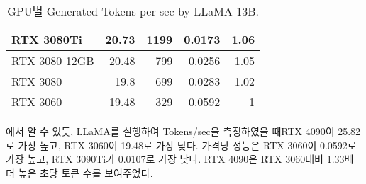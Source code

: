\begin{table}[]
{\begin{tabular}{|l|r|r|r|r|}
RTX 3080Ti    & 20.73                           & 1199                               & 0.0173                                                                                                       & 1.06                                                                                                       \\ \hline
RTX 3080 12GB & 20.48                           & 799                                & 0.0256                                                                                                       & 1.05                                                                                                       \\ \hline
RTX 3080      & 19.8                            & 699                                & 0.0283                                                                                                       & 1.02                                                                                                       \\ \hline
RTX 3060      & 19.48                           & 329                                & 0.0592                                                                                                       & 1                                                                                                          \\ \hline
\end{tabular}%
}
\caption{\label{llamabenchmarktable}GPU별 Generated Tokens per sec by LLaMA-13B.}
\end{table}

\tableautorefname{\ref{llamabenchmarktable}}에서 알 수 있듯, LLaMA를 실행하여 Tokens/sec을 측정하였을 때RTX 4090이 25.82로 가장 높고, RTX 3060이 19.48로 가장 낮다. 가격당 성능은 RTX 3060이 0.0592로 가장 높고, RTX 3090Ti가 0.0107로 가장 낮다. RTX 4090은 RTX 3060대비 1.33배 더 높은 초당 토큰 수를 보여주었다.